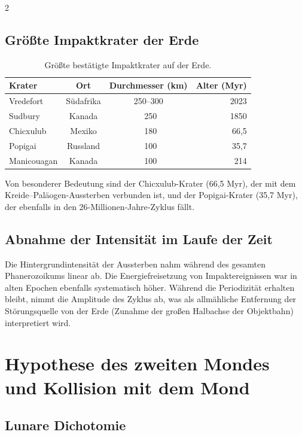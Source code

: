 \documentclass[11pt,a4paper]{article}
\begin{document}
\begin{multicols}{2}
		\subsection{Größte Impaktkrater der Erde}
		
		\begin{table}[htbp]
			\centering
			\caption{Größte bestätigte Impaktkrater auf der Erde.}
			\label{tab:craters}
			\footnotesize
			\begin{tabular}{lccr}
				\toprule
				\textbf{Krater} & \textbf{Ort} & \textbf{Durchmesser (km)} & \textbf{Alter (Myr)} \\
				\midrule
				Vredefort & Südafrika & 250–300 & 2023 \\
				Sudbury & Kanada & ~250 & 1850 \\
				Chicxulub & Mexiko & ~180 & 66,5 \\
				Popigai & Russland & ~100 & 35,7 \\
				Manicouagan & Kanada & ~100 & 214 \\
				\bottomrule
			\end{tabular}
		\end{table}
		
		Von besonderer Bedeutung sind der Chicxulub-Krater (66,5 Myr), der mit dem Kreide–Paläogen-Aussterben verbunden ist, und der Popigai-Krater (35,7 Myr), der ebenfalls in den 26‑Millionen‑Jahre‑Zyklus fällt.
		
		\subsection{Abnahme der Intensität im Laufe der Zeit}
		
		Die Hintergrundintensität der Aussterben nahm während des gesamten Phanerozoikums linear ab. Die Energiefreisetzung von Impaktereignissen war in alten Epochen ebenfalls systematisch höher. Während die Periodizität erhalten bleibt, nimmt die Amplitude des Zyklus ab, was als allmähliche Entfernung der Störungsquelle von der Erde (Zunahme der großen Halbachse der Objektbahn) interpretiert wird.
		
		\section{Hypothese des zweiten Mondes und Kollision mit dem Mond}
		
		\subsection{Lunare Dichotomie}
		

\end{multicols}
\end{document}
